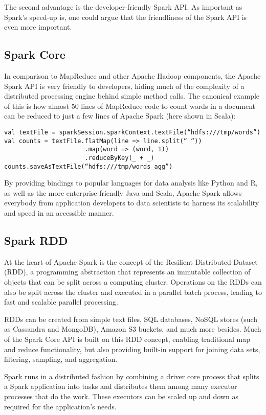 \documentclass[a4paper,12pt]{article}
\begin{document}
The second advantage is the developer-friendly Spark API. As important as Spark’s speed-up is, one could argue that the friendliness of the Spark API is even more important.

\subsection{Spark Core}

In comparison to MapReduce and other Apache Hadoop components, the Apache Spark API is very friendly to developers, hiding much of the complexity of a distributed processing engine behind simple method calls. The canonical example of this is how almost 50 lines of MapReduce code to count words in a document can be reduced to just a few lines of Apache Spark (here shown in Scala):
\begin{verbatim}
val textFile = sparkSession.sparkContext.textFile(“hdfs:///tmp/words”)
val counts = textFile.flatMap(line => line.split(“ “))
                      .map(word => (word, 1))
                      .reduceByKey(_ + _)
counts.saveAsTextFile(“hdfs:///tmp/words_agg”)
\end{verbatim}

By providing bindings to popular languages for data analysis like Python and R, as well as the more enterprise-friendly Java and Scala, Apache Spark allows everybody from application developers to data scientists to harness its scalability and speed in an accessible manner.

\subsection{Spark RDD}

At the heart of Apache Spark is the concept of the Resilient Distributed Dataset (RDD), a programming abstraction that represents an immutable collection of objects that can be split across a computing cluster. Operations on the RDDs can also be split across the cluster and executed in a parallel batch process, leading to fast and scalable parallel processing.

RDDs can be created from simple text files, SQL databases, NoSQL stores (such as Cassandra and MongoDB), Amazon S3 buckets, and much more besides. Much of the Spark Core API is built on this RDD concept, enabling traditional map and reduce functionality, but also providing built-in support for joining data sets, filtering, sampling, and aggregation.

Spark runs in a distributed fashion by combining a driver core process that splits a Spark application into tasks and distributes them among many executor processes that do the work. These executors can be scaled up and down as required for the application’s needs.
\end{document}
